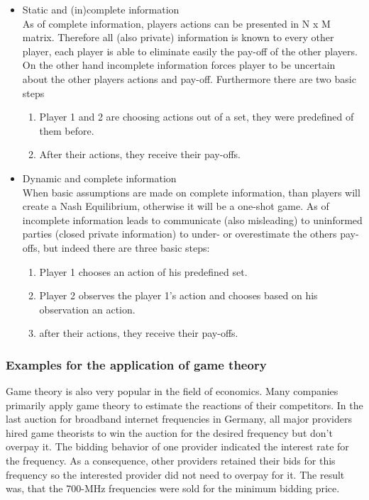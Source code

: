 \begin{itemize}
	\item Static and (in)complete information\\
	As of complete information, players actions can be presented in N x M matrix.
	Therefore all (also private) information is known to every other player, each player is able to eliminate easily the pay-off of the other players.
	On the other hand incomplete information forces player to be uncertain about the other players actions and pay-off.
	Furthermore there are two basic steps
	\begin{enumerate}
		\item Player 1 and 2 are choosing actions out of a set, they were predefined of them before.
		\item After their actions, they receive their pay-offs.
	\end{enumerate}
	\item Dynamic and complete information\\
	When basic assumptions are made on complete information, than players will create a Nash Equilibrium, otherwise it will be a one-shot game.
	As of incomplete information leads to communicate (also misleading) to uninformed parties (closed 	private information) to under- or overestimate the others pay-offs, but indeed there are three basic steps: 
	\begin{enumerate}
		\item Player 1 chooses an action of his predefined set.
		\item Player 2 observes the player 1's action and chooses based on his observation an action.
		\item after their actions, they receive their pay-offs.
	\end{enumerate}
\end{itemize}


\subsubsection{Examples for the application of game theory}
Game theory is also very popular in the field of economics.
Many companies primarily apply game theory to estimate the reactions of their competitors. 
In the last auction for broadband internet frequencies in Germany, all major providers hired game theorists to win the auction for the desired frequency but don't overpay it.
The bidding behavior of one provider indicated the interest rate for the frequency. 
As a consequence, other providers retained their bids for this frequency so the interested provider did not need to overpay for it. 
The result was, that the 700-MHz frequencies were sold for the minimum bidding price. \cite{gametheoryWelt}

